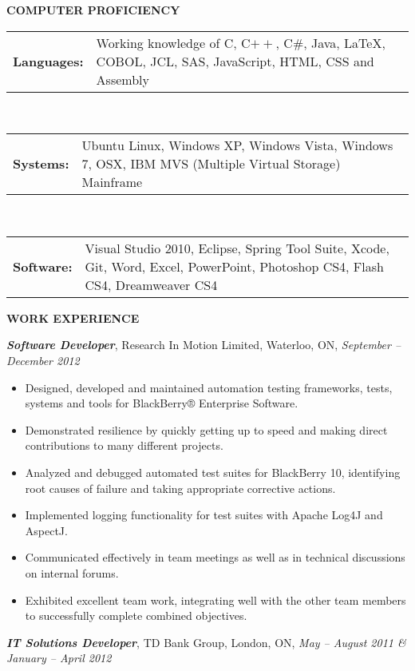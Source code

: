 \documentclass[10pt,letterpaper]{article}
\newenvironment{indentedlist}[1]%
{\begin{list}{}%
	{\setlength{\leftmargin}{#1}}%
	\item[]%
}
{\end{list}}
\newcommand{\proficiency}[2]
{
	\begin{tabular}{p{0.1\columnwidth} p{0.83\columnwidth}}
		\textbf{#1} & #2
	\end{tabular}
}
\newcommand{\job}[4]
{
	\emph{\textbf{#1}}, #2, #3, \emph{#4}
}
\begin{document}
	
	\textbf{COMPUTER PROFICIENCY}
	\begin{indentedlist}{2em}
				\proficiency{Languages:} {Working knowledge of C, C$++$, C\#, Java, \LaTeX, COBOL, JCL, SAS, JavaScript, HTML, CSS and Assembly}\\
				\proficiency{Systems:} {Ubuntu Linux, Windows XP, Windows Vista, Windows 7, OSX, IBM MVS (Multiple Virtual Storage) Mainframe}\\
				\proficiency{Software:} {Visual Studio 2010, Eclipse, Spring Tool Suite, Xcode, Git, Word, Excel, PowerPoint, Photoshop CS4, Flash CS4, Dreamweaver CS4}
	\end{indentedlist}
	
	\textbf{WORK EXPERIENCE}
	
		\vspace{0.5em}
	
		\job{Software Developer}{Research In Motion Limited}{Waterloo, ON}{September -- December 2012}
		\begin{indentedlist}{2em}
			\begin{itemize}
				\item Designed, developed and maintained automation testing frameworks, tests, systems and tools for BlackBerry® Enterprise Software.
				\item Demonstrated resilience by quickly getting up to speed and making direct contributions to many different projects.
				\item Analyzed and debugged automated test suites for BlackBerry 10, identifying root causes of failure and taking appropriate corrective actions.
				\item Implemented logging functionality for test suites with Apache Log4J and AspectJ.
				\item Communicated effectively in team meetings as well as in technical discussions on internal forums.
				\item Exhibited excellent team work, integrating well with the other team members to successfully complete combined objectives.
			\end{itemize}
		\end{indentedlist}
			
		\job{IT Solutions Developer}{TD Bank Group}{London, ON}{May -- August 2011 \& January -- April 2012}
		
\end{document}
